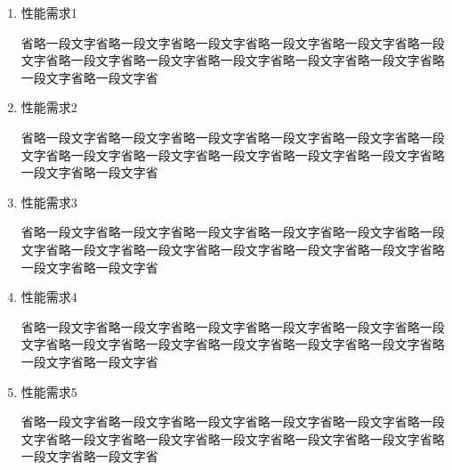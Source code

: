 	\begin{enumerate}[fullwidth,itemindent=2em,listparindent=2em]
  
  	\item 性能需求1
  	
  	省略一段文字省略一段文字省略一段文字省略一段文字省略一段文字省略一段文字省略一段文字省略一段文字省略一段文字省略一段文字省略一段文字省略一段文字省略一段文字省  	
  	\item 性能需求2
  	
  	省略一段文字省略一段文字省略一段文字省略一段文字省略一段文字省略一段文字省略一段文字省略一段文字省略一段文字省略一段文字省略一段文字省略一段文字省略一段文字省
  	
  	\item 性能需求3
  	
  	省略一段文字省略一段文字省略一段文字省略一段文字省略一段文字省略一段文字省略一段文字省略一段文字省略一段文字省略一段文字省略一段文字省略一段文字省略一段文字省
  	
  	\item 性能需求4
  	
  	省略一段文字省略一段文字省略一段文字省略一段文字省略一段文字省略一段文字省略一段文字省略一段文字省略一段文字省略一段文字省略一段文字省略一段文字省略一段文字省  	
  	\item 性能需求5
  	
  	省略一段文字省略一段文字省略一段文字省略一段文字省略一段文字省略一段文字省略一段文字省略一段文字省略一段文字省略一段文字省略一段文字省略一段文字省略一段文字省
  
  
	\end{enumerate}


\clearpage